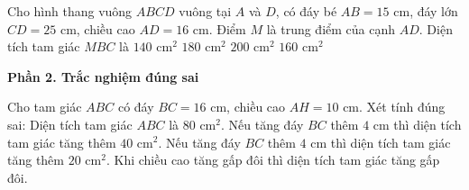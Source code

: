 \begin{ex} %
Cho hình thang vuông $ABCD$ vuông tại $A$ và $D$, có đáy bé $AB = 15\text{ cm}$, đáy lớn $CD = 25\text{ cm}$, chiều cao $AD = 16\text{ cm}$. Điểm $M$ là trung điểm của cạnh $AD$. Diện tích tam giác $MBC$ là
\choice
{$140\text{ cm}^2$}
{$180\text{ cm}^2$}
{$200\text{ cm}^2$}
{\True $160\text{ cm}^2$}
\end{ex}

\textbf{Phần 2. Trắc nghiệm đúng sai}

\begin{ex} %
Cho tam giác $ABC$ có đáy $BC = 16\text{ cm}$, chiều cao $AH = 10\text{ cm}$. Xét tính đúng sai:
\choiceTF
{\True Diện tích tam giác $ABC$ là $80\text{ cm}^2$.}
{Nếu tăng đáy $BC$ thêm $4\text{ cm}$ thì diện tích tam giác tăng thêm $40\text{ cm}^2$.}
{\True Nếu tăng đáy $BC$ thêm $4\text{ cm}$ thì diện tích tam giác tăng thêm $20\text{ cm}^2$.}
{\True Khi chiều cao tăng gấp đôi thì diện tích tam giác tăng gấp đôi.}
\end{ex}

